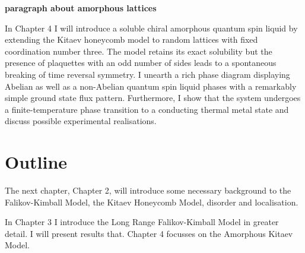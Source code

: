 \textbf{paragraph about amorphous lattices}

In Chapter 4 I will introduce a soluble chiral amorphous quantum spin liquid by extending the Kitaev honeycomb model to random lattices with fixed coordination number three. The model retains its exact solubility but the presence of plaquettes with an odd number of sides leads to a spontaneous breaking of time reversal symmetry. I unearth a rich phase diagram displaying Abelian as well as a non-Abelian quantum spin liquid phases with a remarkably simple ground state flux pattern. Furthermore, I show that the system undergoes a finite-temperature phase transition to a conducting thermal metal state and discuss possible experimental realisations.

\hypertarget{outline}{%
\section{Outline}\label{outline}}

The next chapter, Chapter 2, will introduce some necessary background to the Falikov-Kimball Model, the Kitaev Honeycomb Model, disorder and localisation.

In Chapter 3 I introduce the Long Range Falikov-Kimball Model in greater detail. I will present results that. Chapter 4 focusses on the Amorphous Kitaev Model.
